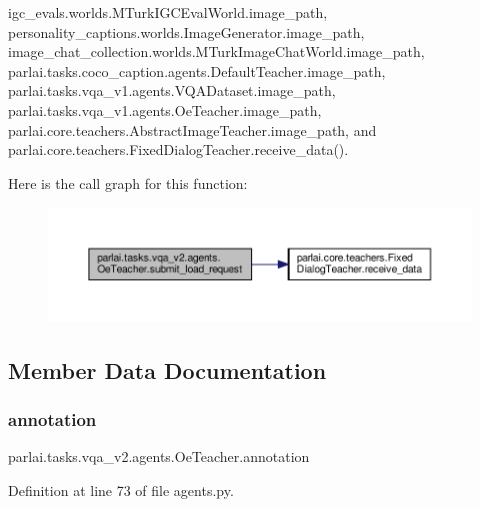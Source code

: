 igc\+\_\+evals.\+worlds.\+M\+Turk\+I\+G\+C\+Eval\+World.\+image\+\_\+path, personality\+\_\+captions.\+worlds.\+Image\+Generator.\+image\+\_\+path, image\+\_\+chat\+\_\+collection.\+worlds.\+M\+Turk\+Image\+Chat\+World.\+image\+\_\+path, parlai.\+tasks.\+coco\+\_\+caption.\+agents.\+Default\+Teacher.\+image\+\_\+path, parlai.\+tasks.\+vqa\+\_\+v1.\+agents.\+V\+Q\+A\+Dataset.\+image\+\_\+path, parlai.\+tasks.\+vqa\+\_\+v1.\+agents.\+Oe\+Teacher.\+image\+\_\+path, parlai.\+core.\+teachers.\+Abstract\+Image\+Teacher.\+image\+\_\+path, and parlai.\+core.\+teachers.\+Fixed\+Dialog\+Teacher.\+receive\+\_\+data().

Here is the call graph for this function\+:
\nopagebreak
\begin{figure}[H]
\begin{center}
\leavevmode
\includegraphics[width=350pt]{classparlai_1_1tasks_1_1vqa__v2_1_1agents_1_1OeTeacher_afc1a8af21f49e95d90ee64af6c560f1b_cgraph}
\end{center}
\end{figure}


\subsection{Member Data Documentation}
\mbox{\label{classparlai_1_1tasks_1_1vqa__v2_1_1agents_1_1OeTeacher_ad195c1182da5744f020d6181a7b99218}} 
\subsubsection{\texorpdfstring{annotation}{annotation}}
{\footnotesize\ttfamily parlai.\+tasks.\+vqa\+\_\+v2.\+agents.\+Oe\+Teacher.\+annotation}



Definition at line 73 of file agents.\+py.



